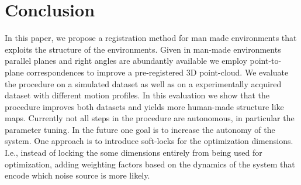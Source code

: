 \section{Conclusion}

In this paper, we propose a registration method for man made environments that exploits the structure of the environments. 
Given in man-made environments parallel planes and right angles are abundantly available we employ point-to-plane correspondences to improve a pre-registered 3D point-cloud. 
We evaluate the procedure on a simulated dataset as well as on a experimentally acquired dataset with different motion profiles. 
In this evaluation we show that the procedure improves both datasets and yields more human-made structure like maps. 
Currently not all steps in the procedure are autonomous, in particular the parameter tuning. 
In the future one goal is to increase the autonomy of the system.
One approach is to introduce soft-locks for the optimization dimensions.
I.e., instead of locking the some dimensions entirely from being used for optimization, adding weighting factors based on the dynamics of the system that encode which noise source is more likely.  
